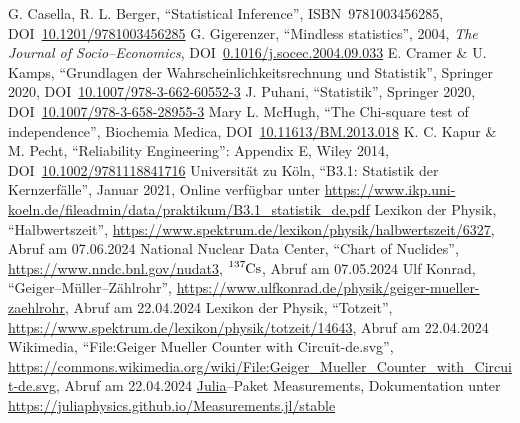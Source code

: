 \documentclass[12pt,a4paper]{scrartcl}
\numberwithin{equation}{section} %
\newcommand{\code}[1]{\textsf{#1}}
\begin{document}
\begin{thebibliography}{99}
	G. Casella, R. L. Berger, ``Statistical Inference'', ISBN~9781003456285,
	DOI~\href{https://doi.org/10.1201/9781003456285}{10.1201/9781003456285}
	G. Gigerenzer, ``Mindless statistics'', 2004, \emph{The Journal of
		Socio--Economics},
		DOI~\href{https://doi.org/10.1016/j.socec.2004.09.033}{0.1016/j.socec.2004.09.033}
	E. Cramer \& U. Kamps, ``Grundlagen der Wahrscheinlichkeitsrechnung
	und Statistik'', Springer 2020, DOI~\href{https://doi.org/10.1007/978-3-662-60552-3}{10.1007/978-3-662-60552-3}
	J. Puhani, ``Statistik'', Springer 2020, DOI~\href{https://doi.org/10.1007/978-3-658-28955-3}{10.1007/978-3-658-28955-3}
	Mary L. McHugh, ``The Chi-square test of independence'', Biochemia Medica, DOI~\href{https://doi.org/10.11613/BM.2013.018}{10.11613/BM.2013.018}
	K. C. Kapur \& M. Pecht, ``Reliability Engineering'': Appendix E,
	Wiley 2014,
	DOI~\href{https://doi.org/10.1002/9781118841716}{10.1002/9781118841716}
	Universität zu Köln, ``B3.1: Statistik der Kernzerfälle'', Januar
	2021, Online verfügbar unter
	\url{https://www.ikp.uni-koeln.de/fileadmin/data/praktikum/B3.1_statistik_de.pdf}
	Lexikon der Physik, ``Halbwertszeit'', \url{https://www.spektrum.de/lexikon/physik/halbwertszeit/6327}, Abruf am 07.06.2024
	National Nuclear Data Center, ``Chart of Nuclides'',
	\url{https://www.nndc.bnl.gov/nudat3}, $\ce{^{137}Cs}$,
	Abruf am 07.05.2024
	Ulf Konrad, ``Geiger--Müller--Zählrohr'', \url{https://www.ulfkonrad.de/physik/geiger-mueller-zaehlrohr}, Abruf am 22.04.2024
	Lexikon der Physik, ``Totzeit'', \url{https://www.spektrum.de/lexikon/physik/totzeit/14643}, Abruf am 22.04.2024
	Wikimedia, ``File:Geiger Mueller Counter with Circuit-de.svg'', \url{https://commons.wikimedia.org/wiki/File:Geiger_Mueller_Counter_with_Circuit-de.svg}, Abruf am 22.04.2024
	\code{\href{https://julialang.org}{Julia}}--Paket \code{Measurements}, Dokumentation unter \url{https://juliaphysics.github.io/Measurements.jl/stable}
\end{thebibliography}
\end{document}
